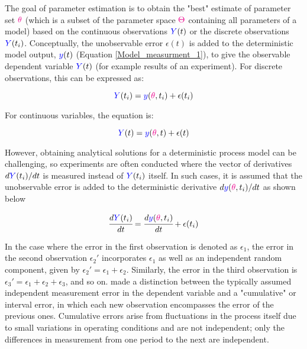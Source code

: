\documentclass[../Article_Model_Parameters.tex]{subfiles}
\begin{document}
	The goal of parameter estimation is to obtain the "best" estimate of parameter set ${\color{magenta} \theta}$ (which is a subset of the parameter space ${\color{magenta}\Theta}$ containing all parameters of a model) based on the continuous observations ${\color{blue}Y}(t)$ or the discrete observations ${\color{blue}Y}(t_i)$. Conceptually, the unobservable error $\epsilon(t)$ is added to the deterministic model output, ${\color{blue}y}(t)$ (Equation \ref{Model_measurment_1}), to give the observable dependent variable ${\color{blue}Y}(t)$ (for example results of an experiment). For discrete observations, this can be expressed as:
	
	{\footnotesize
		\begin{equation*}
			{\color{blue}Y}(t_i) = {\color{blue}y}({\color{magenta} \theta}, t_i) + \epsilon(t_i)
	\end{equation*} }
	
	For continuous variables, the equation is:
	
	{\footnotesize
		\begin{equation*}
			{\color{blue}Y}(t) = {\color{blue}y}({\color{magenta} \theta}, t) + \epsilon(t)
	\end{equation*} }
	
	However, obtaining analytical solutions for a deterministic process model can be challenging, so experiments are often conducted where the vector of derivatives $d{\color{blue}Y}(t_i)/dt$ is measured instead of ${\color{blue}Y}(t_i)$ itself. In such cases, it is assumed that the unobservable error is added to the deterministic derivative $d{\color{blue}y}({\color{magenta} \theta}, t_i)/dt$ as shown below
	
	{\footnotesize
		\begin{equation}  \label{EQ: Measurment_noise}
			\cfrac{d {\color{blue}Y}(t_i)}{dt} = \cfrac{d{\color{blue}y}({\color{magenta} \theta}, t_i)}{dt} + \epsilon(t_i)
	\end{equation} }
	
	In the case where the error in the first observation is denoted as $\epsilon_1$, the error in the second observation $\epsilon_2'$ incorporates $\epsilon_1$ as well as an independent random component, given by $\epsilon_2' = \epsilon_1 + \epsilon_2$. Similarly, the error in the third observation is $\epsilon_3' = \epsilon_1 + \epsilon_2 + \epsilon_3$, and so on. \citet{Mandel1957}  made a distinction between the typically assumed independent measurement error in the dependent variable and a "cumulative" or interval error, in which each new observation encompasses the error of the previous ones. Cumulative errors arise from fluctuations in the process itself due to small variations in operating conditions and are not independent; only the differences in measurement from one period to the next are independent.
	
\end{document}
